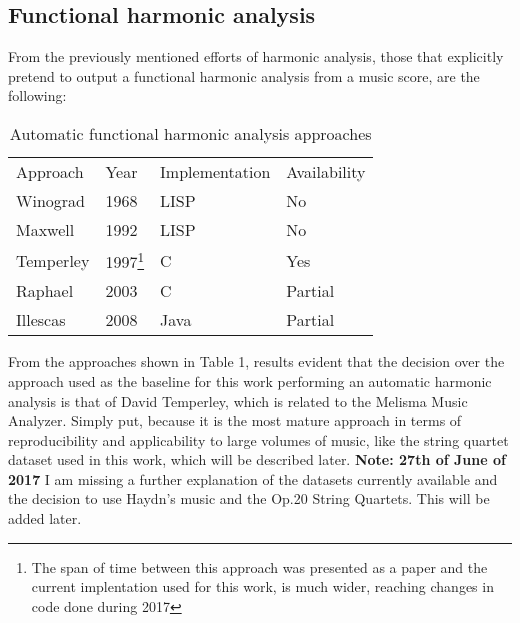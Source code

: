   \subsection{Functional harmonic analysis}
  From the previously mentioned efforts of harmonic analysis, those that explicitly pretend to output a functional harmonic analysis from a music score, are the following:
  \begin{table}[]
    \centering
    \caption{Automatic functional harmonic analysis approaches}
    \label{my-label}
    \begin{tabular}{llll}
      Approach & Year & Implementation & Availability \\
      Winograd & 1968 & LISP & No \\
      Maxwell & 1992 & LISP & No \\
      Temperley & 1997\footnote{The span of time between this approach was presented as a paper and the current implentation used for this work, is much wider, reaching changes in code done during 2017} & C & Yes \\
      Raphael & 2003 & C & Partial \\
      Illescas & 2008 & Java & Partial
    \end{tabular}
  \end{table}
  From the approaches shown in Table 1, results evident that the decision over the approach used as the baseline for this work performing an automatic harmonic analysis is that of David Temperley, which is related to the Melisma Music Analyzer. Simply put, because it is the most mature approach in terms of reproducibility and applicability to large volumes of music, like the string quartet dataset used in this work, which will be described later.
  \textbf{Note: 27th of June of 2017}
  I am missing a further explanation of the datasets currently available and the decision to use Haydn's music and the Op.20 String Quartets. This will be added later.

\newpage
